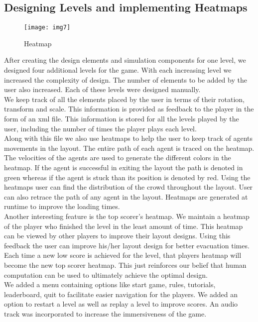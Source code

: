 \subsection{Designing Levels and implementing Heatmaps}
\begin{figure}[H]
    \centering
    {{\texttt{[image: img7]} }}%
    \caption{Heatmap}%
\end{figure}
After creating the design elements and simulation components for one level, we designed four additional levels for the game. With each increasing level we increased the complexity of design. The number of elements to be added by the user also increased. Each of these levels were designed manually.\\
We keep track of all the elements placed by the user in terms of their rotation, transform and scale. This information is provided as feedback to the player in the form of an xml file. This information is stored for all the levels played by the user, including the number of times the player plays each level.\\
Along with this file we also use heatmaps to help the user to keep track of agents movements in the layout. The entire path of each agent is traced on the heatmap. The velocities of the agents are used to generate the different colors in the heatmap. If the agent is successful in exiting the layout the path is denoted in green whereas if the agent is stuck than its position is denoted by red. Using the heatmaps user can find the distribution of the crowd throughout the layout. User can also retrace the path of any agent in the layout. Heatmaps are generated at runtime to improve the loading times.\\
Another interesting feature is the top scorer's heatmap. We maintain a heatmap of the player who finished the level in the least amount of time. This heatmap can be viewed by other players to improve their layout designs. Using this feedback the user can improve his/her layout design for better evacuation times. Each time a new low score is achieved for the level, that players heatmap will become the new top scorer heatmap.  This just reinforces our belief that human computation can be used to ultimately achieve the optimal design.\\
We added a menu containing options like start game, rules, tutorials, leaderboard, quit to facilitate easier navigation for the players. We added an option to restart a level as well as replay a level to improve scores. An audio track was incorporated to increase the immersiveness of the game.
